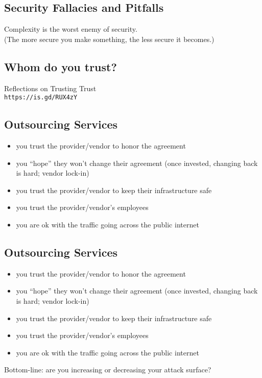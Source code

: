 \documentclass[xga]{xdvislides}
\begin{document}
\subsection{Security Fallacies and Pitfalls}
\vspace*{\fill}
\begin{center}
    \Hugesize
	Complexity is the worst enemy of security. \\
	\vspace{.25in}
	\Normalsize
	(The more secure you make something, the less secure it becomes.)
\end{center}
\vspace*{\fill}

\subsection{Whom do you trust?}
\vspace*{\fill}
\begin{center}
\Huge
	Reflections on Trusting Trust \\

\Normalsize
	\verb+https://is.gd/RUX4zY+
\end{center}
\vspace*{\fill}
\Normalsize

\subsection{Outsourcing Services}
\begin{itemize}
	\item you trust the provider/vendor to honor the agreement
	\item you ``hope'' they won't change their agreement (once
		invested, changing back is hard; vendor lock-in)
	\item you trust the provider/vendor to keep their infrastructure
		safe
	\item you trust the provider/vendor's employees
	\item you are ok with the traffic going across the public internet
\end{itemize}

\subsection{Outsourcing Services}
\begin{itemize}
	\item you trust the provider/vendor to honor the agreement
	\item you ``hope'' they won't change their agreement (once
		invested, changing back is hard; vendor lock-in)
	\item you trust the provider/vendor to keep their infrastructure
		safe
	\item you trust the provider/vendor's employees
	\item you are ok with the traffic going across the public internet
\end{itemize}
\addvspace{.5in}
Bottom-line: are you increasing or decreasing your
attack surface? \\
\end{document}
